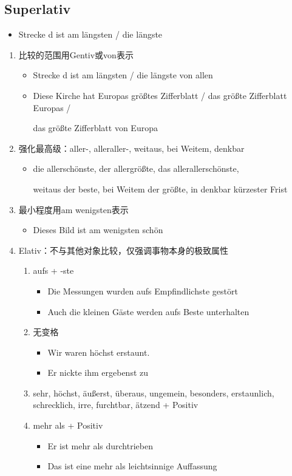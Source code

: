 \documentclass[UTF8]{report}
\begin{document}
\subsection{Superlativ}
\begin{itemize}
    \item Strecke d ist am längsten / die längste
\end{itemize}
\begin{enumerate}
    \item 比较的范围用Gentiv或von表示
    \begin{itemize}
        \item Strecke d ist am längsten / die längste von allen 
        \item Diese Kirche hat Europas größtes Zifferblatt / das größte Zifferblatt Europas / 
        
        das größte Zifferblatt von Europa
    \end{itemize}
    \item 强化最高级：aller-, alleraller-, weitaus, bei Weitem, denkbar
    \begin{itemize}
        \item die allerschönste, der allergrößte, das allerallerschönste, 
        
        weitaus der beste, bei Weitem der größte, in denkbar kürzester Frist
    \end{itemize}
    \item 最小程度用am wenigsten表示
    \begin{itemize}
        \item Dieses Bild ist am wenigsten schön
    \end{itemize}
    \item Elativ：不与其他对象比较，仅强调事物本身的极致属性
    \begin{enumerate}
        \item aufs + -ste
        \begin{itemize}
            \item Die Messungen wurden aufs Empfindlichste gestört
            \item Auch die kleinen Gäste werden aufs Beste unterhalten
        \end{itemize}
        \item 无变格
        \begin{itemize}
            \item Wir waren höchst erstaunt.
            \item Er nickte ihm ergebenst zu
        \end{itemize}
        \item sehr, höchst, äußerst, überaus, ungemein, besonders, erstaunlich, schrecklich, irre, furchtbar, ätzend + Positiv
        \item mehr als + Positiv
        \begin{itemize}
            \item Er ist mehr als durchtrieben
            \item Das ist eine mehr als leichtsinnige Auffassung
        \end{itemize}
    \end{enumerate}
\end{enumerate}
\end{document}
